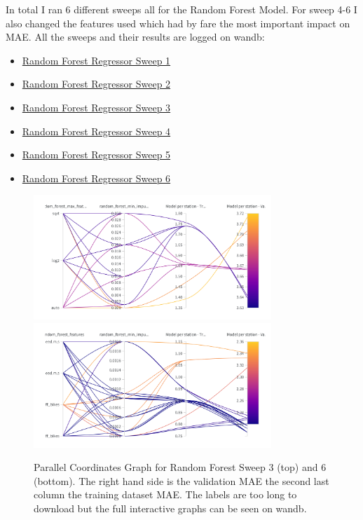 \documentclass[a4paper]{article}
\begin{document}
    In total I ran 6 different sweeps all for the Random Forest Model. For sweep 4-6 I also changed the features used which
    had by fare the most important impact on MAE. All the sweeps and their results are logged on wandb:
    \begin{itemize}
        \item \href{https://wandb.ai/idegen/mlp-2021/sweeps/ylvvcigm?workspace=user-idegen}{Random Forest Regressor Sweep 1}
        \item \href{https://wandb.ai/idegen/mlp-2021/sweeps/79bi8rgn?workspace=user-idegen}{Random Forest Regressor Sweep 2}
        \item \href{https://wandb.ai/idegen/mlp-2021/sweeps/42mzcyb3?workspace=user-idegen}{Random Forest Regressor Sweep 3}
        \item \href{https://wandb.ai/idegen/mlp-2021/sweeps/rrpaocle?workspace=user-idegen}{Random Forest Regressor Sweep 4}
        \item \href{https://wandb.ai/idegen/mlp-2021/sweeps/au3spnyx?workspace=user-idegen}{Random Forest Regressor Sweep 5}
        \item \href{https://wandb.ai/idegen/mlp-2021/sweeps/lc68mqc3?workspace=user-idegen}{Random Forest Regressor Sweep 6}
    \end{itemize}

    \begin{figure}[h]
        \centering
        \includegraphics[width=0.8\textwidth]{randomforest-sweep3}
        \includegraphics[width=0.8\textwidth]{random-forest-sweep6}
        \caption{Parallel Coordinates Graph for Random Forest Sweep 3 (top) and 6 (bottom). The right hand side is the
        validation MAE the second last column the training dataset MAE. The labels are too long to download but the
        full interactive graphs can be seen on wandb.}
        \label{fig:sweep3and6RandomForest}
    \end{figure}
\end{document}
